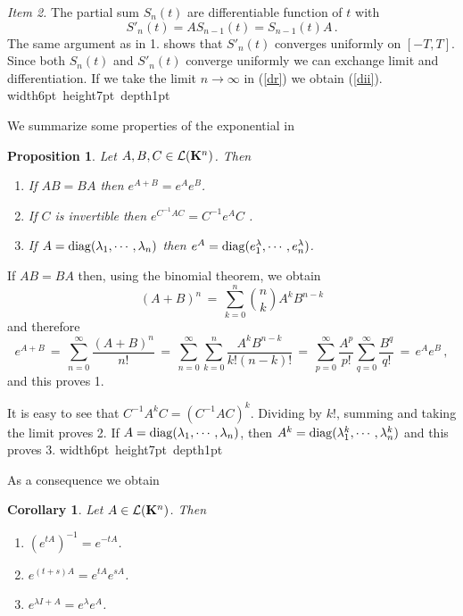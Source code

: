 \documentclass[12pt]{report}
\newcommand{\calL}{{\cal L}}
\newcommand{\bK}{{\bf K}}
\newtheorem{prop}[theorem]{Proposition}
\newtheorem{corollary}[theorem]{Corollary}
\newcommand{\proof}{\noindent {\em Proof:~}}
\def\eqref#1{(\ref{#1})}
\def\qed{\hbox{\hskip 6pt\vrule width6pt height7pt depth1pt
    \hskip1pt}\bigskip}
\def\to{\rightarrow}
\begin{document}
{\em Item 2.}  The partial sum $S_n(t)$ are differentiable function of
$t$ with
\begin{equation}\label{dr}
S'_n(t) = A S_{n-1}(t) = S_{n-1}(t) A\,.
\end{equation}
The same argument as in 1. shows that $S'_n(t)$ converges uniformly on
$[-T,T]$. Since both $S_n(t)$ and $S'_n(t)$ converge uniformly we can
exchange limit and differentiation.  If we take the limit $n \to
\infty$ in \eqref{dr} we obtain \eqref{dii}. \hfill \qed


We summarize some properties of the exponential in 
\begin{prop} Let $A,B,C \in \calL(\bK^n)$. Then
\begin{enumerate}
\item If $AB =BA$ then $e^{A+B}= e^A e^B$. 
\item If $C$ is invertible then $e^{C^{-1} A C} = C^{-1} e^A C$ .
\item If $A={\rm diag}(\lambda_1, \cdots, \lambda_n)$ then $e^A= {\rm
diag}(e^\lambda_1, \cdots, e^\lambda_n)$.
\end{enumerate}
\end{prop}

\proof If $AB =BA$ then, using the binomial theorem, we obtain 
\begin{equation}
(A+B)^n \,=\, \sum_{k=0}^n {n \choose k} A^k B^{n-k}
\end{equation} 
and therefore
\begin{equation} 
e^{A+B}\,=\, \sum_{n=0}^\infty
\frac{(A+B)^n}{n!}\,=\,\sum_{n=0}^\infty \sum_{k=0}^n \frac{A^k
B^{n-k}}{k! (n-k)!} \,=\, \sum_{p=0}^\infty \frac{A^p}{p!}
\sum_{q=0}^\infty \frac{B^q}{q!}\,=\, e^A e^B\,,
\end{equation}
and this proves 1. 

It is easy to see that $C^{-1} A^k C = \left(C^{-1} A
C\right)^k$. Dividing by $k!$, summing and taking the limit proves 2.
If $A={\rm diag}(\lambda_1, \cdots, \lambda_n)$, then $A^k={\rm
diag}(\lambda_1^k, \cdots, \lambda_n^k)$ and this proves 3. \hfill \qed

As a consequence we obtain 
\begin{corollary} Let $A \in \calL(\bK^n)$. Then
\begin{enumerate}
\item $(e^{tA})^{-1} = e^{-tA}$.
\item $e^{(t+s)A}= e^{tA} e^{sA}$. 
\item $e^{\lambda I + A}= e^\lambda e^A$.  
\end{enumerate}
\end{corollary}
\end{document}
